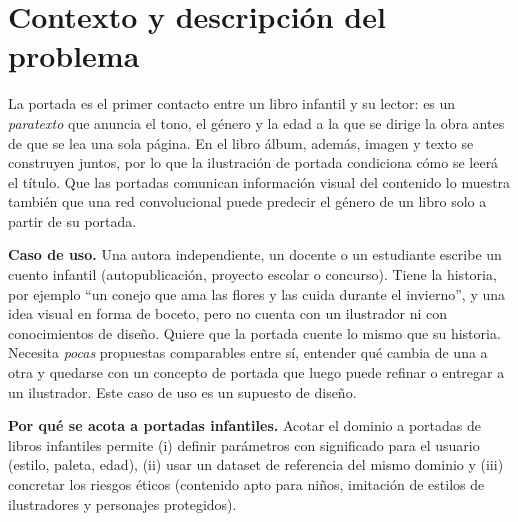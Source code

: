 \documentclass[10pt,a4paper,twocolumn]{article}
\begin{document}
\section{Contexto y descripción del problema}
La portada es el primer contacto entre un libro infantil y su lector: es un \emph{paratexto} que anuncia el tono, el género y la edad a la que se dirige la obra antes de que se lea una sola página. En el libro álbum, además, imagen y texto se construyen juntos, por lo que la ilustración de portada condiciona cómo se leerá el título. Que las portadas comunican información visual del contenido lo muestra también que una red convolucional puede predecir el género de un libro solo a partir de su portada.

\textbf{Caso de uso.} Una autora independiente, un docente o un estudiante escribe un cuento infantil (autopublicación, proyecto escolar o concurso). Tiene la historia, por ejemplo ``un conejo que ama las flores y las cuida durante el invierno'', y una idea visual en forma de boceto, pero no cuenta con un ilustrador ni con conocimientos de diseño. Quiere que la portada cuente lo mismo que su historia. Necesita \emph{pocas} propuestas comparables entre sí, entender qué cambia de una a otra y quedarse con un concepto de portada que luego puede refinar o entregar a un ilustrador. Este caso de uso es un supuesto de diseño.

\textbf{Por qué se acota a portadas infantiles.} Acotar el dominio a portadas de libros infantiles permite (i) definir parámetros con significado para el usuario (estilo, paleta, edad), (ii) usar un dataset de referencia del mismo dominio y (iii) concretar los riesgos éticos (contenido apto para niños, imitación de estilos de ilustradores y personajes protegidos).
\end{document}
